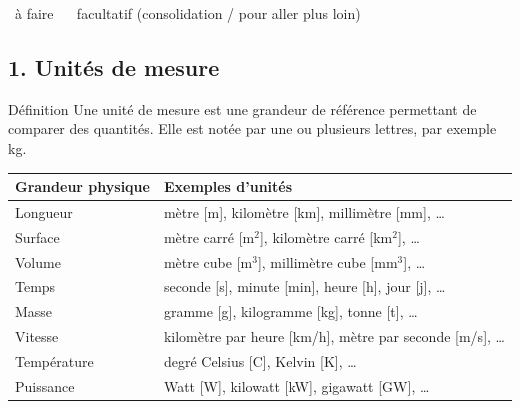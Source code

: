 
 \vfill
\begin{center}
\small \case~à faire \qquad \oblig~ \qquad \faclt~facultatif (consolidation / pour aller plus loin)
\end{center}
\vspace{1em}


\newpage
{}

\subsection*{1. Unités de mesure}

\begin{regle}{Définition}
Une \textcolor{themeColor}{unité de mesure} est une grandeur de référence permettant de comparer des quantités. Elle est notée par une ou plusieurs lettres, par exemple kg.
\end{regle}


\vspace{20pt}
\def\arraystretch{2}
\begin{tabularx}{\linewidth}{|l|X|}
\hline
\rowcolor{themeColor!30}Grandeur physique & Exemples d'unités \\\hline
Longueur & mètre [m], kilomètre [km], millimètre [mm], \ldots \\\hline
Surface & mètre carré [m$^2$], kilomètre carré [km$^2$], \ldots \\\hline
Volume & mètre cube [m$^3$], millimètre cube [mm$^3$], \ldots \\\hline
Temps & seconde [s], minute [min], heure [h], jour [j], \ldots \\\hline
Masse & gramme [g], kilogramme [kg], tonne [t], \ldots \\\hline
Vitesse & kilomètre par heure [km/h], mètre par seconde [m/s], \ldots \\\hline
Température & degré Celsius [\textdegree{}C], Kelvin [K], \ldots \\\hline
Puissance & Watt [W], kilowatt [kW], gigawatt [GW], \ldots \\\hline
\end{tabularx}
\def\arraystretch{1}

